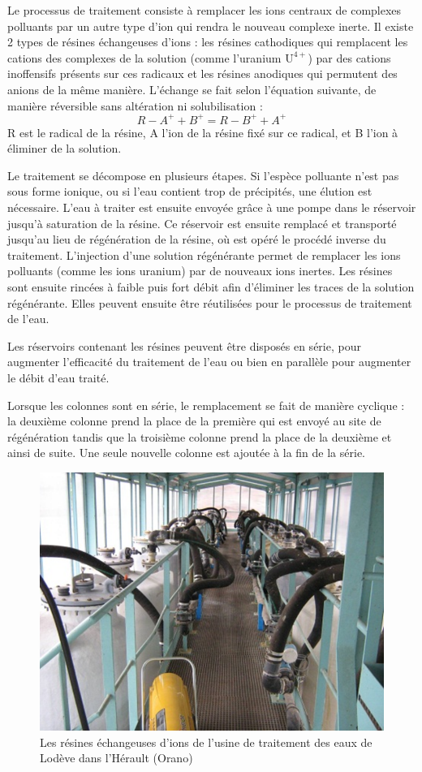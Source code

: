 \documentclass{article}
\begin{document}
Le processus de traitement consiste à remplacer les ions centraux de complexes polluants par un autre type d’ion qui rendra le nouveau complexe inerte. Il existe 2 types de résines échangeuses d’ions : les résines cathodiques qui remplacent les cations des complexes de la solution (comme l’uranium $\text{U}^{4+}$) par des cations inoffensifs présents sur ces radicaux et les résines anodiques qui permutent des anions de la même manière.
L’échange se fait selon l’équation suivante, de manière réversible sans altération ni solubilisation :
$$R-A^+ + B^+ = R-B^+ + A^+$$
R est le radical de la résine, A l’ion de la résine fixé sur ce radical, et B l’ion à éliminer de la solution.

Le traitement se décompose en plusieurs étapes. Si l’espèce polluante n’est pas sous forme ionique, ou si l’eau contient trop de précipités, une élution est nécessaire. L’eau à traiter est ensuite envoyée grâce à une pompe dans le réservoir jusqu’à saturation de la résine. Ce réservoir est ensuite remplacé et transporté jusqu’au lieu de régénération de la résine, où est opéré le procédé inverse du traitement. L’injection d’une solution régénérante permet de remplacer les ions polluants (comme les ions uranium) par de nouveaux ions inertes. Les résines sont ensuite rincées à faible puis fort débit afin d’éliminer les traces de la solution régénérante. Elles peuvent ensuite être réutilisées pour le processus de traitement de l’eau.

Les réservoirs contenant les résines peuvent être disposés en série, pour augmenter l’efficacité du traitement de l’eau ou bien en parallèle pour augmenter le débit d’eau traité.

Lorsque les colonnes sont en série, le remplacement se fait de manière cyclique : la deuxième colonne prend la place de la première qui est envoyé au site de régénération tandis que la troisième colonne prend la place de la deuxième et ainsi de suite. Une seule nouvelle colonne est ajoutée à la fin de la série. %

\begin{figure}[H]
\centering
\includegraphics[width=0.5\linewidth]{III_A_3.png}
\caption{Les résines échangeuses d'ions de l'usine de traitement des eaux de Lodève dans l'Hérault (Orano)}
\label{fig:usine_traitement_resines}
\end{figure}
\end{document}
